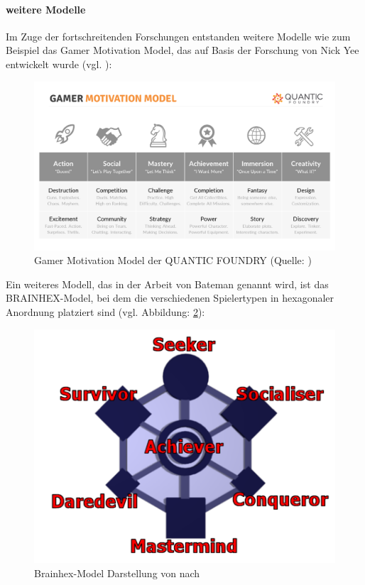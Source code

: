 \paragraph{weitere Modelle}
Im Zuge der fortschreitenden Forschungen entstanden weitere Modelle wie zum Beispiel das Gamer Motivation Model, das auf Basis der Forschung von Nick Yee entwickelt wurde (vgl. \cite{ludologie_spielertypen_nodate}):

\begin{figure}[ht]
\centering
\includegraphics[width=1\linewidth]{content/pictures/gamer_motivations_model.png}
\caption{Gamer Motivation Model der QUANTIC FOUNDRY (Quelle: \cite{noauthor_quantic_nodate})}
\label{fig:gamer_motivation_model}
\end{figure}

Ein weiteres Modell, das in der Arbeit von Bateman genannt wird, ist das BRAINHEX-Model, bei dem die verschiedenen Spielertypen in hexagonaler Anordnung platziert sind (vgl. Abbildung: \ref{fig:brain-hex}):

\begin{figure}[ht]
\centering
\includegraphics[width=1\linewidth]{content/pictures/brainhex-classes.png}
\caption{Brainhex-Model Darstellung von \cite{noauthor_i_nodate} nach \cite{nacke_brainhex_2013}}
\label{fig:brain-hex}
\end{figure}

